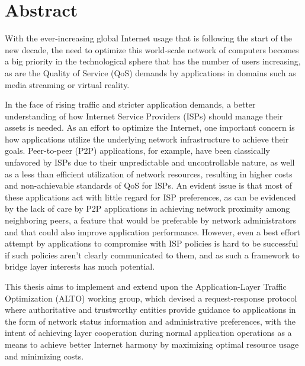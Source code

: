 \chapter{Abstract}

    With the ever-increasing global Internet usage that is following the start of the new decade, the need to optimize this world-scale network of computers becomes a big priority in the technological sphere that has the number of users increasing, as are the Quality of Service (QoS) demands by applications in domains such as media streaming or virtual reality.

    In the face of rising traffic and stricter application demands, a better understanding of how Internet Service Providers (ISPs) should manage their assets is needed.
    As an effort to optimize the Internet, one important concern is how applications utilize the underlying network infrastructure to achieve their goals.
    Peer-to-peer (P2P) applications, for example, have been classically unfavored by ISPs due to their unpredictable and uncontrollable nature, as well as a less than efficient utilization of network resources, resulting in higher costs and non-achievable standards of QoS for ISPs.
    An evident issue is that most of these applications act with little regard for ISP preferences, as can be evidenced by the lack of care by P2P applications in achieving network proximity among neighboring peers, a feature that would be preferable by network administrators and that could also improve application performance.
    However, even a best effort attempt by applications to compromise with ISP policies is hard to be successful if such policies aren't clearly communicated to them, and as such a framework to bridge layer interests has much potential.

    This thesis aims to implement and extend upon the Application-Layer Traffic Optimization (ALTO) working group, which devised a request-response protocol where authoritative and trustworthy entities provide guidance to applications in the form of network status information and administrative preferences, with the intent of achieving layer cooperation during normal application operations as a means to achieve better Internet harmony by maximizing optimal resource usage and minimizing costs.

